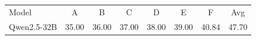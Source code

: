 \documentclass{article}
\begin{document}
\begin{tabular}{lccccccc}
Model & A & B & C & D & E & F & Avg \\
Qwen2.5-32B & 35.00 & 36.00 & 37.00 & 38.00 & 39.00 & 40.84 & 47.70 \\
\end{tabular}
\end{document}
